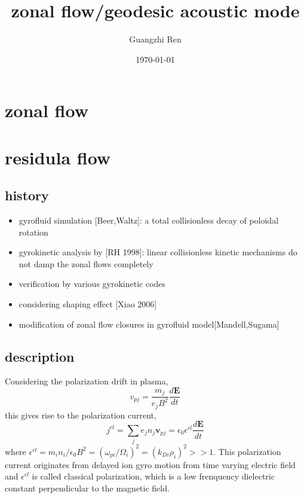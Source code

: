 \documentclass[11pt,a4paper]{article}
\title{zonal flow/geodesic acoustic mode}
\author{Guangzhi Ren}
\date{\today}
\begin{document}
	
	\maketitle
	
\section{zonal flow}


\newpage
\section{residula flow}	

	\subsection{history}
	\begin{itemize}
		\item gyrofluid simulation [Beer,Waltz]: a total collisionless decay of poloidal rotation
		\item gyrokinetic analysis by [RH 1998]: linear collisionless kinetic mechanisms do not damp the zonal flows completely
		\item verification by various gyrokinetic codes
		\item considering shaping effect [Xiao 2006]
		\item modification of zonal flow closures in gyrofluid model[Mandell,Sugama]
	\end{itemize}
	
	\subsection{description}
	Considering the polarization drift in plasma, 
\begin{equation}
	v_{pj}=\frac{m_j}{e_jB^2}\frac{d\pmb{E}}{dt}
	\end{equation}
	this gives rise to the polarization current,
	\begin{equation}
	j^{cl}=\sum_{j}{e_jn_j\pmb{v}_{pj}}=\epsilon_0\epsilon^{cl}\frac{d\pmb{E}}{dt}
	\end{equation}
	where $\epsilon^{cl}=m_in_i/\epsilon_0B^2=(\omega_{pi}/\Omega_i)^2=(k_{Di}\rho_i)^2>>1$. This polarization current originates from delayed ion gyro motion from time varying electric field and $\epsilon^{cl}$ is called classical polarization, which is a low frenquency dielectric constant perpendicular to the magnetic field.
\end{document}
